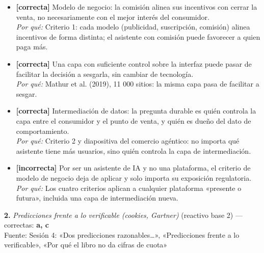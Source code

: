 \documentclass[10pt,letterpaper]{article}
\begin{document}
\begin{itemize}[leftmargin=1.2em,itemsep=0pt,topsep=1pt,parsep=0pt]
\item[\textbf{a)}] {\footnotesize \textbf{[correcta]} Modelo de negocio: la comisión alinea sus incentivos con cerrar la venta, no necesariamente con el mejor interés del consumidor.\\ \textit{Por qué:} Criterio 1: cada modelo (publicidad, suscripción, comisión) alinea incentivos de forma distinta; el asistente con comisión puede favorecer a quien paga más.}
\item[\textbf{b)}] {\footnotesize \textbf{[correcta]} Una capa con suficiente control sobre la interfaz puede pasar de facilitar la decisión a sesgarla, sin cambiar de tecnología.\\ \textit{Por qué:} Mathur et al. (2019), 11 000 sitios: la misma capa pasa de facilitar a sesgar.}
\item[\textbf{c)}] {\footnotesize \textbf{[correcta]} Intermediación de datos: la pregunta durable es quién controla la capa entre el consumidor y el punto de venta, y quién es dueño del dato de comportamiento.\\ \textit{Por qué:} Criterio 2 y diapositiva del comercio agéntico: no importa qué asistente tiene más usuarios, sino quién controla la capa de intermediación.}
\item[\textbf{d)}] {\footnotesize \textbf{[incorrecta]} Por ser un asistente de IA y no una plataforma, el criterio de modelo de negocio deja de aplicar y solo importa su exposición regulatoria.\\ \textit{Por qué:} Los cuatro criterios aplican a cualquier plataforma «presente o futura», incluida una capa de intermediación nueva.}
\end{itemize}
\vspace{3pt}\noindent\textbf{2.} \textit{Predicciones frente a lo verificable (cookies, Gartner)} (reactivo base 2) — correctas: \textbf{a, c}\\[-1pt]
{\scriptsize Fuente: Sesión 4: «Dos predicciones razonables…», «Predicciones frente a lo verificable», «Por qué el libro no da cifras de cuota»}
\end{document}
